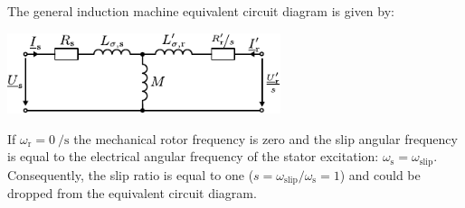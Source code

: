 



\begin{solutionblock}
    The general induction machine equivalent circuit diagram is given by:
    \begin{center}
        \includegraphics[width=0.6\textwidth]{../../lecture/fig/lec06/IM_T_ECD_steady_state.pdf}
    \end{center}
    If $\omega_\mathrm{r}=\SI{0}{\per\second}$ the mechanical rotor frequency is zero and the slip angular frequency is equal to the electrical angular frequency of the stator excitation: $\omega_\mathrm{s}= \omega_\mathrm{slip}$. Consequently, the slip ratio is equal to one ($s=\omega_\mathrm{slip}/\omega_\mathrm{s}=1$) and could be dropped from the equivalent circuit diagram.
\end{solutionblock}

